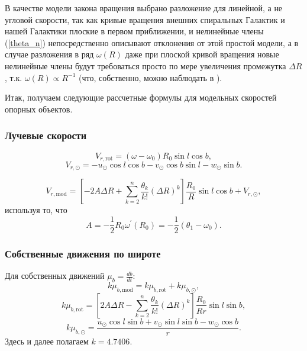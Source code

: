 \documentclass{matmex-diploma-custom}
\begin{document}
\par В качестве модели закона вращения выбрано разложение для линейной, а не угловой скорости, так как кривые вращения внешних спиральных Галактик и нашей Галактики плоские в первом приближении, и нелинейные члены (\ref{theta_n}) непосредственно описывают отклонения от этой простой модели, а в случае разложения в ряд $\omega(R)$ даже при плоской кривой вращения новые нелинейные члены будут требоваться просто по мере увеличения промежутка $\Delta R$, т.к. $\omega(R) \propto R^{-1}$ (что, собственно, можно наблюдать в \cite{Rastorguev}).

\par Итак, получаем следующие рассчетные формулы для модельных скоростей опорных объектов.

\subsubsection{Лучевые скорости} \label{def_mod_vr}
\begin{equation}
        V_{r, \mathrm{rot}} = (\omega - \omega_0)R_0 \sin{l} \cos{b},
\end{equation}
\begin{equation}
        V_{r, \odot} = -u_{\odot} \cos{l} \cos{b} - v_{\odot} \cos{b} \sin{l} - w_{\odot} \sin{b}.
\end{equation}

\begin{equation}
        V_{r, \mathrm{mod}} = \left[ -2A\Delta R + \sum^n_{k = 2} \frac{\theta_k}{k!} \left( \Delta R \right)^k \right] \frac{R_0}{R} \sin{l} \cos{b} + V_{r, \odot},
\end{equation}
используя то, что
\begin{equation}
        A = - \frac{1}{2} R_0 \omega^{'}(R_0) = - \frac{1}{2} (\theta_1 - \omega_0).
\end{equation}
\subsubsection{Собственные движения по широте} \label{def_mod_b}
Для собственных движений $\mu_b = \frac{db}{dt}$:
\begin{equation}
        k\mu_{b, \mathrm{mod}} = k\mu_{b, \mathrm{rot}} + k\mu_{b, \odot},
\end{equation}
\begin{equation}
        k\mu_{b, \mathrm{rot}} = \left[ 2A\Delta R - \sum^n_{k = 2} \frac{\theta_k}{k!} \left( \Delta R \right)^k \right] \frac{R_0}{Rr} \sin{l} \sin{b},
\end{equation}
\begin{equation}
        k\mu_{b, \odot} = \frac{u_{\odot}\cos{l}\sin{b} + v_{\odot}\sin{l}\sin{b} - w_{\odot}\cos{b}}{r}.
\end{equation}
Здесь и далее полагаем $k=4.7406$.
\end{document}
